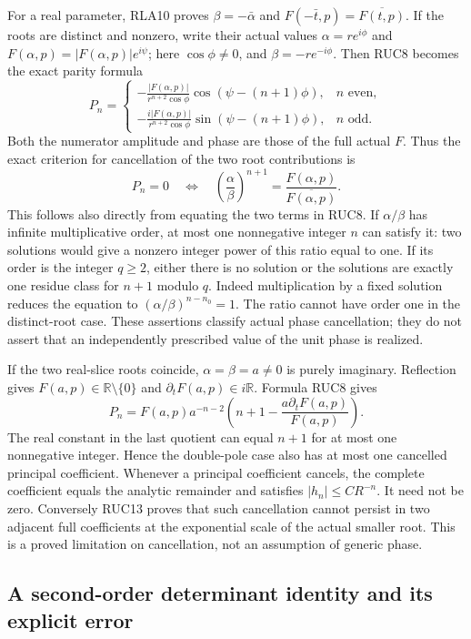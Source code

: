\documentclass[11pt]{article}
\begin{document}
For a real parameter, RLA10 proves
$\beta=-\bar\alpha$ and $F(-\bar t,p)=\overline{F(t,p)}$.
If the roots are distinct and nonzero, write their actual values
$\alpha=r e^{i\phi}$ and $F(\alpha,p)=|F(\alpha,p)|e^{i\psi}$;
here $\cos\phi\ne0$, and $\beta=-r e^{-i\phi}$.
Then RUC8 becomes the exact parity formula
\[
 P_n=\begin{cases}
 \displaystyle-\frac{|F(\alpha,p)|}{r^{n+2}\cos\phi}
          \cos(\psi-(n+1)\phi),&n\text{ even},\\[5pt]
 \displaystyle-\frac{i|F(\alpha,p)|}{r^{n+2}\cos\phi}
          \sin(\psi-(n+1)\phi),&n\text{ odd}.
 \end{cases}\tag{RUC14}
\]
Both the numerator amplitude and phase are those of the full
actual $F$.  Thus the exact criterion for cancellation of the
two root contributions is
\[
 P_n=0\quad\Longleftrightarrow\quad
 \left(\frac\alpha\beta\right)^{n+1}
       =\frac{F(\alpha,p)}{\overline{F(\alpha,p)}}.
 \tag{RUC15}
\]
This follows also directly from equating the two terms in RUC8.
If $\alpha/\beta$ has infinite multiplicative order, at most one
nonnegative integer $n$ can satisfy it: two solutions would give
a nonzero integer power of this ratio equal to one.  If its order
is the integer $q\ge2$, either there is no solution or the
solutions are exactly one residue class for $n+1$ modulo $q$.
Indeed multiplication by a fixed solution reduces the equation
to $(\alpha/\beta)^{n-n_0}=1$.  The ratio cannot have order one
in the distinct-root case.  These assertions classify actual
phase cancellation; they do not assert that an independently
prescribed value of the unit phase is realized.

If the two real-slice roots coincide, $\alpha=\beta=a\ne0$ is
purely imaginary.  Reflection gives $F(a,p)\in\mathbb R\setminus\{0\}$
and $\partial_tF(a,p)\in i\mathbb R$.  Formula RUC8 gives
\[
 P_n=F(a,p)a^{-n-2}
           \left(n+1-\frac{a\partial_tF(a,p)}{F(a,p)}\right).
 \tag{RUC16}
\]
The real constant in the last quotient can equal $n+1$ for at
most one nonnegative integer.  Hence the double-pole case also
has at most one cancelled principal coefficient.
Whenever a principal coefficient cancels, the complete coefficient
equals the analytic remainder and satisfies $|h_n|\le CR^{-n}$.
It need not be zero.  Conversely RUC13 proves that such
cancellation cannot persist in two adjacent full coefficients
at the exponential scale of the actual smaller root.  This is a
proved limitation on cancellation, not an assumption of generic phase.

\subsection{A second-order determinant identity and its explicit error}
\end{document}
